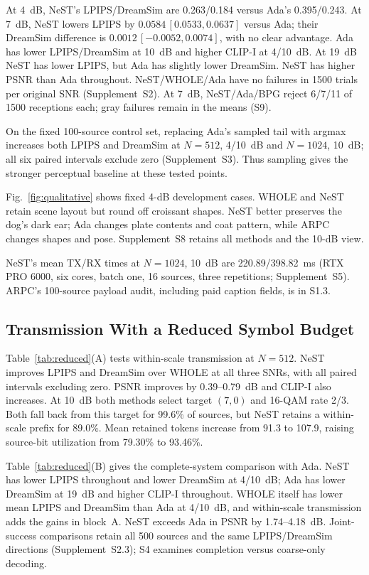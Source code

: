 At 4~dB, NeST's LPIPS/DreamSim are 0.263/0.184 versus Ada's 0.395/0.243. At 7~dB, NeST lowers LPIPS by $0.0584\,[0.0533,0.0637]$ versus Ada; their DreamSim difference is $0.0012\,[-0.0052,0.0074]$, with no clear advantage. Ada has lower LPIPS/DreamSim at 10~dB and higher CLIP-I at 4/10~dB. At 19~dB NeST has lower LPIPS, but Ada has slightly lower DreamSim. NeST has higher PSNR than Ada throughout. NeST/WHOLE/Ada have no failures in 1500 trials per original SNR (Supplement~S2). At 7~dB, NeST/Ada/BPG reject 6/7/11 of 1500 receptions each; gray failures remain in the means (S9).

On the fixed 100-source control set, replacing Ada's sampled tail with argmax increases both LPIPS and DreamSim at $N=512$, 4/10~dB and $N=1024$, 10~dB; all six paired intervals exclude zero (Supplement~S3). Thus sampling gives the stronger perceptual baseline at these tested points.

Fig.~\ref{fig:qualitative} shows fixed 4-dB development cases. WHOLE and NeST retain scene layout but round off croissant shapes. NeST better preserves the dog's dark ear; Ada changes plate contents and coat pattern, while ARPC changes shapes and pose. Supplement~S8 retains all methods and the 10-dB view.

NeST's mean TX/RX times at $N=1024$, 10~dB are 220.89/398.82~ms (RTX PRO 6000, six cores, batch one, 16 sources, three repetitions; Supplement~S5). ARPC's 100-source payload audit, including paid caption fields, is in S1.3.

\subsection{Transmission With a Reduced Symbol Budget}

Table~\ref{tab:reduced}(A) tests within-scale transmission at $N=512$. NeST improves LPIPS and DreamSim over WHOLE at all three SNRs, with all paired intervals excluding zero. PSNR improves by 0.39--0.79~dB and CLIP-I also increases. At 10~dB both methods select target $(7,0)$ and 16-QAM rate 2/3. Both fall back from this target for 99.6\% of sources, but NeST retains a within-scale prefix for 89.0\%. Mean retained tokens increase from 91.3 to 107.9, raising source-bit utilization from 79.30\% to 93.46\%.

Table~\ref{tab:reduced}(B) gives the complete-system comparison with Ada. NeST has lower LPIPS throughout and lower DreamSim at 4/10~dB; Ada has lower DreamSim at 19~dB and higher CLIP-I throughout. WHOLE itself has lower mean LPIPS and DreamSim than Ada at 4/10~dB, and within-scale transmission adds the gains in block~A. NeST exceeds Ada in PSNR by 1.74--4.18~dB. Joint-success comparisons retain all 500 sources and the same LPIPS/DreamSim directions (Supplement~S2.3); S4 examines completion versus coarse-only decoding.
